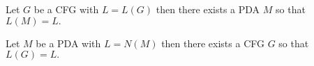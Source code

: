 \begin{theorem}\label{thm:PDA_of_CFG}
  Let $G$ be a CFG with $L=L(G)$ then there exists a PDA $M$ so that $L(M)=L.$
\end{theorem}
\begin{theorem}\label{thm:CFG_of_PDA}
  Let $M$ be a PDA with $L=N(M)$ then there exists a CFG $G$ so that $L(G)=L.$
\end{theorem}
